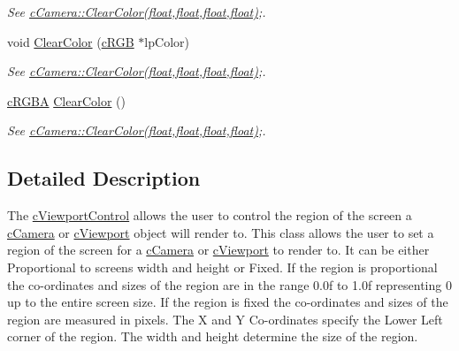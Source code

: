 \begin{DoxyCompactItemize}
\begin{DoxyCompactList}\small\item\em See \hyperlink{classc_viewport_control_ac3cee84c15d6b7bb35daf33a95a41f08}{cCamera::ClearColor(float,float,float,float)};. \end{DoxyCompactList}\item 
\hypertarget{classc_viewport_control_aa5ed9afba3be56e20088734376264c48}{
void \hyperlink{classc_viewport_control_aa5ed9afba3be56e20088734376264c48}{ClearColor} (\hyperlink{classc_r_g_b}{cRGB} $\ast$lpColor)}
\label{classc_viewport_control_aa5ed9afba3be56e20088734376264c48}

\begin{DoxyCompactList}\small\item\em See \hyperlink{classc_viewport_control_ac3cee84c15d6b7bb35daf33a95a41f08}{cCamera::ClearColor(float,float,float,float)};. \end{DoxyCompactList}\item 
\hypertarget{classc_viewport_control_ace2c8b3be8773b37cd4eee63f6e87a45}{
\hyperlink{classc_r_g_b_a}{cRGBA} \hyperlink{classc_viewport_control_ace2c8b3be8773b37cd4eee63f6e87a45}{ClearColor} ()}
\label{classc_viewport_control_ace2c8b3be8773b37cd4eee63f6e87a45}

\begin{DoxyCompactList}\small\item\em See \hyperlink{classc_viewport_control_ac3cee84c15d6b7bb35daf33a95a41f08}{cCamera::ClearColor(float,float,float,float)};. \end{DoxyCompactList}\end{DoxyCompactItemize}


\subsection{Detailed Description}
The \hyperlink{classc_viewport_control}{cViewportControl} allows the user to control the region of the screen a \hyperlink{classc_camera}{cCamera} or \hyperlink{classc_viewport}{cViewport} object will render to. This class allows the user to set a region of the screen for a \hyperlink{classc_camera}{cCamera} or \hyperlink{classc_viewport}{cViewport} to render to. It can be either Proportional to screens width and height or Fixed. If the region is proportional the co-\/ordinates and sizes of the region are in the range 0.0f to 1.0f representing 0 up to the entire screen size. If the region is fixed the co-\/ordinates and sizes of the region are measured in pixels. The X and Y Co-\/ordinates specify the Lower Left corner of the region. The width and height determine the size of the region. 

